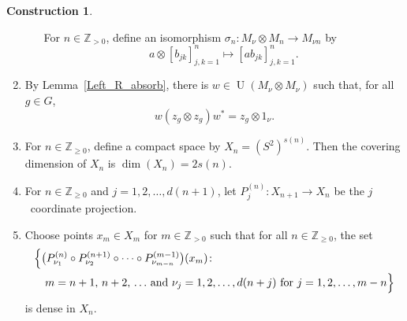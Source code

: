 \documentclass[10pt]{amsart}
\numberwithin{equation}{section}
\theoremstyle{definition}
\newtheorem{ctn}[thm]{Construction}
\newcommand{\N}{{\mathbb{Z}}_{> 0}}
\newcommand{\Nz}{{\mathbb{Z}}_{\geq 0}}
\newcommand{\U}{{\operatorname{U}}}
\begin{document}
\begin{ctn}
\begin{enumerate}
\begin{enumerate}
For $n \in \N$, define an  isomorphism $\sigma_{n} \colon M_{\nu} \otimes M_{n} \to M_{\nu n}$ by 
\[
a \otimes [b_{jk}]_{j,k =1}^{n} 
\mapsto
 \left[a b_{jk} \right]_{j, k =1}^{n}.
\]
\end{enumerate} 
\item\label{Ctn_5}
By Lemma~\ref{Left_R_absorb}, there is $w \in \U (M_{\nu} \otimes M_{\nu})$ such that, for all $g \in G$,
\begin{equation*}
w (z_{g} \otimes z_{g})w^* =  z_{g} \otimes 1_{\nu}.
\end{equation*}
%
\item\label{Ctn_6}
For $n \in \Nz$,
define a compact space by
$X_{n} = (S^{2})^{s (n)}$.
Then the covering dimension of $X_n$
is $\dim ( X_{n} ) = 2 s (n)$.
\item\label{Ctn_7}
For $n \in \Nz$
and $j = 1, 2, \ldots, d (n + 1)$,
let $P^{(n)}_j \colon X_{n + 1} \to X_n$
be the $j$~coordinate projection.
\item\label{Ctn_8}
Choose points $x_m \in X_m$
for $m \in \N$ such that
for all $n \in \Nz$,
the set
\begin{align*}
&
\Bigl\{ \bigl( P^{(n)}_{\nu_{1}} \circ P^{(n + 1)}_{\nu_{2}}
      \circ \cdots \circ P^{(m - 1)}_{\nu_{m - n}} \bigr) (x_m) \colon
\\
& \hspace*{1em} {\mbox{}}
       {\mbox{$m = n + 1, \, n + 2, \, \ldots$
       and $\nu_j = 1, 2, \ldots, d (n + j)$
       for $j = 1, 2, \ldots, m - n$}} \Bigr\}
\end{align*}
is dense in $X_n$.


\end{enumerate}
\end{ctn}
\end{document}
